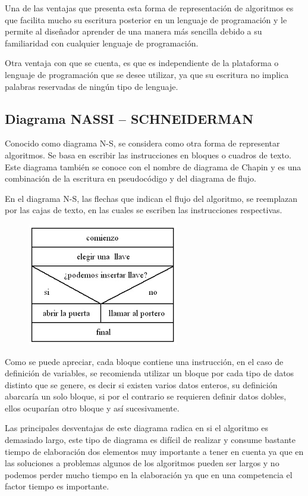 Una de las ventajas que presenta esta forma de representación de algoritmos es que facilita mucho su escritura posterior en un lenguaje de programación y le permite al diseñador aprender de una manera más sencilla debido a su familiaridad con cualquier lenguaje de programación.

Otra ventaja con que se cuenta, es que es independiente de la plataforma o lenguaje de programación que se desee utilizar, ya que su escritura no implica palabras reservadas de ningún tipo de lenguaje.

\subsection{Diagrama NASSI – SCHNEIDERMAN}

Conocido como diagrama N-S, se considera como otra forma de representar algoritmos. Se basa en escribir las instrucciones en bloques o cuadros de texto. Este diagrama también se conoce con el nombre de diagrama de Chapin y es una combinación de la escritura en pseudocódigo y del diagrama de flujo.

En el diagrama N-S, las flechas que indican el flujo del algoritmo, se reemplazan por las cajas de texto, en las cuales se escriben las instrucciones respectivas.

\begin{figure}[!h]
	\centering
	\includegraphics[width=0.4\linewidth]{img/Diagrama_NASSI_SCHNEIDERMAN}
	\label{fig:diagramanassischneiderman}
\end{figure}


Como se puede apreciar, cada bloque contiene una instrucción, en el caso de definición de variables, se recomienda utilizar un bloque por cada tipo de datos distinto que se genere, es decir si existen varios datos enteros, su definición abarcaría un solo bloque, si por el contrario se requieren definir datos dobles, ellos ocuparían otro bloque y así sucesivamente.

Las principales desventajas de este diagrama radica en si el algoritmo es demasiado largo, este tipo de diagrama es difícil de realizar y consume bastante tiempo de elaboración dos elementos muy importante a tener en cuenta ya que en las soluciones a problemas algunos de los algoritmos pueden ser largos y no podemos perder mucho tiempo en la elaboración ya que en una competencia el factor tiempo es importante.
